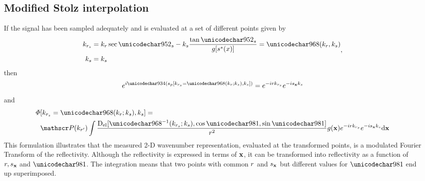 \subsection{Modified Stolz interpolation}
\label{sc:modifiedStolz}
If the signal has been sampled adequately and is evaluated at a set of different points given by
\begin{equation}
\begin{split}
 \krstolt &= \kr\sec\thetas - \kparm\frac{\tan\thetas}{\gfunc[\myparm(\xang)]} = \stolt(\kr,\kparm)\\
 \kparm &= \kparm
\end{split},
\end{equation}
then
\begin{equation}
 \eex{\im\Phi(\stationaryparm[\krstolt = \stolt(\kr;\kparm),\kparm])} = \eex{-\im\range\krstolt}\eex{ -\im\targetxparm\kparm}
\end{equation}
and
\begin{equation}
\begin{split}
 \vkern&[\krstolt = \stolt(\kr;\kparm),\kparm] = \\&\Snvelope(\krc)\int\frac{\dconstelPattern[\stolt^{-1}(\krstolt;\kparm), \cos\targetdepression, \sin\targetdepression]}{\amplitude\range^2}\reflectivity(\targetnoparm)\eex{-\im\range\krstolt}\eex{ -\im\targetxparm\kparm}\d\targetnoparm
 \end{split}
\end{equation}
This formulation illustrates that the measured 2-D wavenumber representation, evaluated at the transformed points, is a modulated Fourier Transform of the reflectivity. Although the reflectivity is expressed in terms of $\mathbf{\mathbf{x}}$, it can be transformed into reflectivity as a function of $r, s_{\mathbf{x}}$ and $\targetdepression$. The integration means that two points with common $r$ and $s_{\mathbf{x}}$ but different values for $\targetdepression$ end up superimposed.
\par
